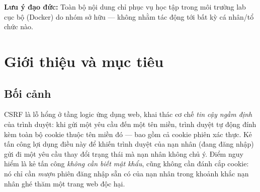 \documentclass[11pt,a4paper]{article}
\begin{document}
\begin{titlepage}
\begin{center}\footnotesize\color{slate}
\textbf{Lưu ý đạo đức:} Toàn bộ nội dung chỉ phục vụ học tập trong môi trường lab cục bộ (Docker) do nhóm sở hữu — không nhằm tác động tới bất kỳ cá nhân/tổ chức nào.
\end{center}
\end{titlepage}

\begin{abstract}
\noindent Báo cáo trình bày quá trình nghiên cứu và thực nghiệm tấn công \textbf{Cross-Site Request Forgery (CSRF)} trên ứng dụng mạng xã hội mã nguồn mở \textbf{Elgg}. Điểm cải tiến so với bài lab gốc là thay thế hoàn toàn \texttt{XMLHttpRequest} và cơ chế \texttt{form submit} bằng \textbf{Fetch API} hiện đại kết hợp \texttt{URLSearchParams} hoặc \texttt{FormData}. Mục tiêu khai thác là thay đổi trường \emph{About me} trong hồ sơ nạn nhân thành chuỗi \texttt{CSRF attack by <MSV>}.

Khác với nhiều báo cáo chỉ dừng ở mô tả, nhóm đã \textbf{dựng và chạy thật} một lab Docker cục bộ (Elgg \textbf{3.3.3}, cô lập loopback), ghi lại \textbf{ảnh chụp màn hình thực tế} từ trình duyệt Chrome và kiểm chứng kết quả ở cả tầng giao diện lẫn tầng HTTP. Báo cáo phân tích gói tin HTTP, giải thích các cơ chế cốt lõi (\texttt{credentials: 'include'}, Simple Request, \texttt{mode: 'no-cors'}), minh hoạ sơ đồ luồng tấn công, trình bày một \textbf{phát hiện kỹ thuật} về cách Elgg lưu trường hồ sơ (annotation so với metadata), và — quan trọng nhất — \textbf{chứng minh bằng thực nghiệm} hiệu quả của hai lớp phòng thủ độc lập: \emph{anti-CSRF token} và \emph{cookie SameSite}. Cuối báo cáo tổng hợp lời giải 15 câu hỏi lý thuyết, quy trình tái hiện và bản khai báo mức độ sử dụng AI.
\end{abstract}

{\hypersetup{linkcolor=ink}\tableofcontents}
\newpage

\section{Giới thiệu và mục tiêu}
\subsection{Bối cảnh}
CSRF là lỗ hổng ở tầng logic ứng dụng web, khai thác cơ chế \emph{tin cậy ngầm định} của trình duyệt: khi gửi một yêu cầu đến một tên miền, trình duyệt tự động đính kèm toàn bộ cookie thuộc tên miền đó — bao gồm cả cookie phiên xác thực. Kẻ tấn công lợi dụng điều này để khiến trình duyệt của nạn nhân (đang đăng nhập) gửi đi một yêu cầu thay đổi trạng thái mà nạn nhân không chủ ý. Điểm nguy hiểm là kẻ tấn công \emph{không cần biết mật khẩu}, cũng không cần đánh cắp cookie: nó chỉ cần \emph{mượn} phiên đăng nhập sẵn có của nạn nhân trong khoảnh khắc nạn nhân ghé thăm một trang web độc hại.
\end{document}
